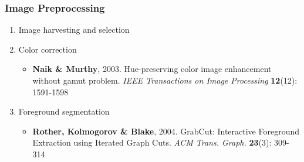 \documentclass[]{beamer}
\begin{document}
    \begin{frame}
        \frametitle{Image Preprocessing}

        \begin{enumerate}
            \item Image harvesting and selection
            \item Color correction
                \begin{itemize}
                    \item \textbf{Naik \& Murthy}, 2003. Hue-preserving color image 
                    enhancement without gamut problem. \textit{IEEE Transactions on
                    Image Processing} \textbf{12}(12): 1591-1598
                \end{itemize}
            \item Foreground segmentation
                \begin{itemize}
                    \item \textbf{Rother, Kolmogorov \& Blake}, 2004. GrabCut: Interactive 
                    Foreground Extraction using Iterated Graph Cuts. 
                    \textit{ACM Trans. Graph.} \textbf{23}(3): 309-314
                \end{itemize}
        \end{enumerate}
    \end{frame}

\end{document}

